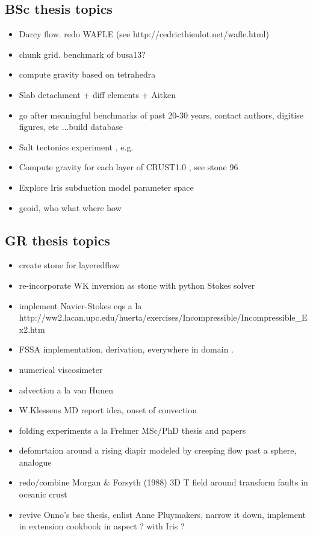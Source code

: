 \subsection{BSc thesis topics}
\begin{itemize} 
\item Darcy flow. redo WAFLE (see http://cedricthieulot.net/wafle.html)
\item chunk grid. benchmark of busa13?
\item compute gravity based on tetrahedra
\item Slab detachment + diff elements + Aitken
\item go after meaningful benchmarks of past 20-30 years, contact authors, digitise figures, etc ...build database
\item Salt tectonics experiment , e.g. \cite{bers72} 
\item Compute gravity for each layer of CRUST1.0 , see stone 96
\item Explore Iris subduction model parameter space
\item geoid, who what where how
\end{itemize}

\subsection{GR thesis topics}
\begin{itemize} 
\item create stone for layeredflow 
\item re-incorporate WK inversion as stone with python Stokes solver
\item implement Navier-Stokes eqs a la http://ww2.lacan.upc.edu/huerta/exercises/Incompressible/Incompressible\_Ex2.htm
\item FSSA implementation, derivation, everywhere in domain \cite{sctc20}. 
\item numerical viscosimeter \cite{batt84}
\item advection a la van Hunen
\item W.Klessens MD report idea, onset of convection
\item folding experiments a la Frehner MSc/PhD thesis and papers 
\item defomrtaion around a rising diapir modeled by creeping flow past a sphere, analogue \cite{crud88}
\item redo/combine Morgan \& Forsyth (1988) \cite{mofo88} 3D T field around transform faults in oceanic crust
\item revive Onno's bsc thesis, enlist Anne Pluymakers, narrow it down, implement in extension cookbook in aspect ? with Iris ?
\end{itemize}

